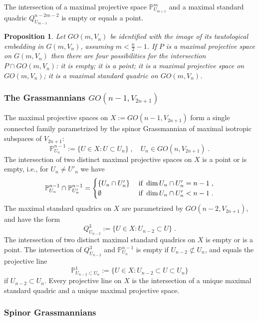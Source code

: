 \documentclass[12pt]{amsart}
\def\PP {{\mathbb P}}     %
\newtheorem{prop}[theorem]{Proposition}
\begin{document}
The intersection of a maximal projective space $\PP^{m}_{U_{m+1}}$ and a maximal standard quadric $Q^{n-2m-2}_{U_{m-1}}$ is empty or equals a point.

\begin{prop}
Let $GO(m,V_n)$ be identified with the image of its tautological embedding in $G(m,V_n)$, assuming $m<\frac{n}{2}-1$. If $P$ is a maximal projective space on $G(m,V_n)$ then there are four possibilities for the intersection $P\cap GO(m,V_n)$: it is empty; it is a point; it is a maximal projective space on $GO(m,V_n)$; it is a maximal standard quadric on $GO(m,V_n)$.
\end{prop}


\subsubsection{The Grassmannians $GO(n-1,V_{2n+1})$}\label{Sec MaxProj in GOcodim1odd} The maximal projective spaces on $X:=GO(n-1,V_{2n+1})$ form a single connected family parametrized by the spinor Grassmannian of maximal isotropic subspaces of $V_{2n+1}$:
$$
\PP^{n-1}_{U_n}:=\{U\in X: U\subset U_n\} \;,\quad U_n\in GO(n,V_{2n+1})\;.
$$
The intersection of two distinct maximal projective spaces on $X$ is a point or is empty, i.e., for $U_n\ne U'_n$ we have
$$
\PP^{n-1}_{U_n}\cap \PP^{n-1}_{U'_n} = \begin{cases} \{ U_n\cap U'_n\} & \;{\rm if}\; \dim U_n\cap U'_n=n-1\;,\\ \emptyset & \;{\rm if}\; \dim U_n\cap U'_n<n-1\;. \end{cases}
$$
The maximal standard quadrics on $X$ are parametrized by $GO(n-2,V_{2n+1})$, and have the form
$$
Q^3_{U_{n-2}}:=\{U\in X: U_{n-2}\subset U\} \;.
$$
The intersection of two distinct maximal standard quadrics on $X$ is empty or is a point. The intersection of $Q^3_{U_{n-2}}$ and $\PP^{n-1}_{U_n}$ is empty if $U_{n-2}\not\subset U_n$, and equals the projective line 
$$
\PP^1_{U_{n-2}\subset U_{n}}:=\{U\in X: U_{n-2}\subset U\subset U_n\}
$$
if $U_{n-2}\subset U_n$. Every projective line on $X$ is the intersection of a unique maximal standard quadric and a unique maximal projective space.


\subsubsection{Spinor Grassmannians}\label{Sec MaxLin on Spinor}
\end{document}
